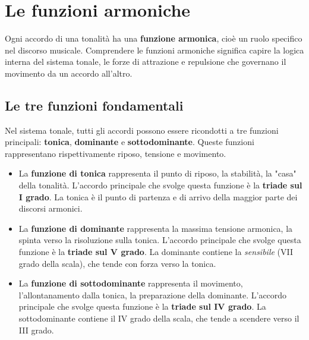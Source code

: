 \chapter{Le funzioni armoniche}
\label{chap:funzioni_armoniche}

Ogni accordo di una tonalità ha una \textbf{funzione armonica}, cioè un ruolo specifico nel discorso musicale. Comprendere le funzioni armoniche significa capire la logica interna del sistema tonale, le forze di attrazione e repulsione che governano il movimento da un accordo all'altro.

\section{Le tre funzioni fondamentali}
\label{sec:tre_funzioni}

Nel sistema tonale, tutti gli accordi possono essere ricondotti a tre funzioni principali: \textbf{tonica}, \textbf{dominante} e \textbf{sottodominante}. Queste funzioni rappresentano rispettivamente riposo, tensione e movimento.

\begin{esempio}
\end{esempio}

\begin{definizione}
	
	\begin{itemize}
		\item \label{def:funzione_tonica}
		La \textbf{funzione di tonica} rappresenta il punto di riposo, la stabilità, la "casa" della tonalità. L'accordo principale che svolge questa funzione è la \textbf{triade sul I grado}. La tonica è il punto di partenza e di arrivo della maggior parte dei discorsi armonici.
		\item \label{def:funzione_dominante}
		La \textbf{funzione di dominante} rappresenta la massima tensione armonica, la spinta verso la risoluzione sulla tonica. L'accordo principale che svolge questa funzione è la \textbf{triade sul V grado}. La dominante contiene la \textit{sensibile} (VII grado della scala), che tende con forza verso la tonica.
		\item 	\label{def:funzione_sottodominante}
		La \textbf{funzione di sottodominante} rappresenta il movimento, l'allontanamento dalla tonica, la preparazione della dominante. L'accordo principale che svolge questa funzione è la \textbf{triade sul IV grado}. La sottodominante contiene il IV grado della scala, che tende a scendere verso il III grado.
	\end{itemize}
\end{definizione}

